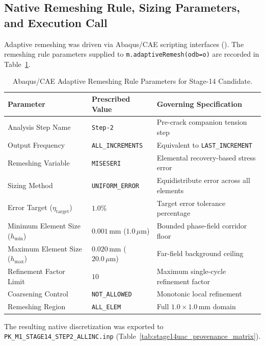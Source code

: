 \subsection{Native Remeshing Rule, Sizing Parameters, and Execution Call}
\label{subsec:stage14uac_remesh_rule}

Adaptive remeshing was driven via Abaqus/CAE scripting interfaces (). The remeshing rule parameters supplied to \texttt{m.adaptiveRemesh(odb=o)} are recorded in Table~\ref{tab:stage14uac_remesh_rule}.

\begin{table}[htbp]
  \centering
  \small
  \caption{Abaqus/CAE Adaptive Remeshing Rule Parameters for Stage-14 Candidate.}
  \label{tab:stage14uac_remesh_rule}
  \begin{tabular}{lll}
    \toprule
    \textbf{Parameter} & \textbf{Prescribed Value} & \textbf{Governing Specification} \\
    \midrule
    Analysis Step Name & \texttt{Step-2} & Pre-crack companion tension step \\
    Output Frequency & \texttt{ALL\_INCREMENTS} & Equivalent to \texttt{LAST\_INCREMENT} \\
    Remeshing Variable & \texttt{MISESERI} & Elemental recovery-based stress error \\
    Sizing Method & \texttt{UNIFORM\_ERROR} & Equidistribute error across all elements \\
    Error Target ($\eta_{\mathrm{target}}$) & $1.0\%$ & Target error tolerance percentage \\
    Minimum Element Size ($h_{\min}$) & $0.001\,\mathrm{mm}$ ($1.0\,\mu\mathrm{m}$) & Bounded phase-field corridor floor \\
    Maximum Element Size ($h_{\max}$) & $0.020\,\mathrm{mm}$ ($20.0\,\mu\mathrm{m}$) & Far-field background ceiling \\
    Refinement Factor Limit & $10$ & Maximum single-cycle refinement factor \\
    Coarsening Control & \texttt{NOT\_ALLOWED} & Monotonic local refinement \\
    Remeshing Region & \texttt{ALL\_ELEM} & Full $1.0 \times 1.0\,\mathrm{mm}$ domain \\
    \bottomrule
  \end{tabular}
\end{table}

The resulting native discretization was exported to \texttt{PK\_M1\_STAGE14\_STEP2\_ALLINC.inp} (Table~\ref{tab:stage14uac_provenance_matrix}).


